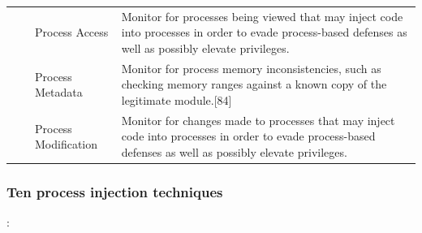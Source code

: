 \documentclass{article}
\begin{document}
\begin{table}[h!]
\begin{tabular}{ |p{1.2cm}||p{2cm}|p{3cm}|p{8cm}|  }
        & & Process Access & Monitor for processes being viewed that may inject code into processes in order to
                             evade process-based defenses as well as possibly elevate privileges. \\
        & & Process Metadata & Monitor for process memory inconsistencies, such as checking memory ranges against a
                               known copy of the legitimate module.[84] \\
        & & Process Modification & Monitor for changes made to processes that may inject code into processes in order
                                   to evade process-based defenses as well as possibly elevate privileges. \\
  \hline
\end{tabular}
\label{table: Detection}
\end{table}

\pagebreak

\subsubsection{\textcite{Hosseini:2017} Ten process injection techniques}

\textbf{}: 
\end{document}
